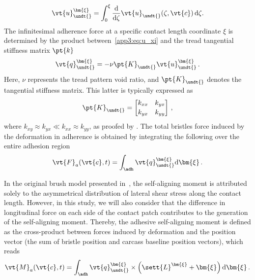 %
\begin{equation}
  \vt{u}_{\undt{}
}^{\bm{\xi}} = \int_0^\xi \dfrac{\mathrm{d}}{\mathrm{d}\zeta}\vt{u}_{\undt{}
}(\zeta,\vt{c}) \,\mathrm{d}\zeta.
  \label{app3:eq:u_xi}
\end{equation}
%
The infinitesimal adherence force at a specific contact length coordinate $\xi$ is determined by the product between~\eqref{app3:eq:u_xi} and the tread tangential stiffness matrix $\pt{k}$
%
\begin{equation}
  \vt{q}_{\undt{}
}^{\bm{\xi}} = -\nu\pt{K}_{\undt{}
}\vt{u}_{\undt{}
}^{\bm{\xi}} \, \text{.}
  \label{app3:eq:fa}
\end{equation}
%
Here, $\nu$ represents the tread pattern void ratio, and $\pt{K}_{\undt{}
}$ denotes the tangential stiffness matrix. This latter is typically expressed as
%
\begin{equation}
  \pt{K}_{\undt{}
} =
  \begin{bmatrix}
    k_{xx} & k_{yx} \\[0.2em]
    k_{yx} & k_{yy}
  \end{bmatrix} \, \text{,}
\end{equation}
%
where $k_{xy} \approx k_{yx} \ll k_{xx} \approx k_{yy}$, as proofed by \citet{okonieski2003simpified}. The total bristles force induced by the deformation in adherence is obtained by integrating the following over the entire adhesion region \adh{}
%
\begin{equation}
  \vt{F}_a(\vt{c},t) = \int_{\adh} \vt{q}_{\undt{}
}^{\bm{\xi}} \mathrm{d}\bm{\xi} \, \text{.}
  \label{app3:eq:F_a}
\end{equation}

In the original brush model presented in~\cite{pacejka2012tire}, the self-aligning moment is attributed solely to the asymmetrical distribution of lateral shear stress along the contact length. However, in this study, we will also consider that the difference in longitudinal force on each side of the contact patch contributes to the generation of the self-aligning moment. Thereby, the adhesive self-aligning moment is defined as the cross-product between forces induced by deformation and the position vector (the sum of bristle position and carcass baseline position vectors), which reads
%
\begin{equation}
  \vt{M}_{a}(\vt{c},t) = \int_{\adh} \vt{q}_{\undt{}
}^{\bm{\xi}} \times \left(\sett{L}^{\bm{\xi}} + \bm{\xi}\right) \mathrm{d}\bm{\xi} \, \text{.}
  \label{app3:eq:M_a}
\end{equation}

